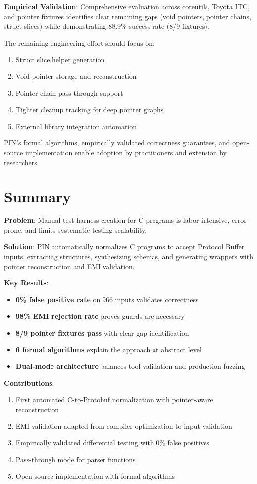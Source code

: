 \documentclass[doublespace,nopageskip]{VTthesis}
\begin{document}
\textbf{Empirical Validation}: Comprehensive evaluation across coreutils, Toyota ITC, and pointer fixtures identifies clear remaining gaps (void pointers, pointer chains, struct slices) while demonstrating 88.9\% success rate (8/9 fixtures).

The remaining engineering effort should focus on:
\begin{enumerate}
    \item Struct slice helper generation
    \item Void pointer storage and reconstruction
    \item Pointer chain pass-through support
    \item Tighter cleanup tracking for deep pointer graphs
    \item External library integration automation
\end{enumerate}

PIN's formal algorithms, empirically validated correctness guarantees, and open-source implementation enable adoption by practitioners and extension by researchers.

\chapter{Summary} \label{ch:summary}

\textbf{Problem}: Manual test harness creation for C programs is labor-intensive, error-prone, and limits systematic testing scalability.

\textbf{Solution}: PIN automatically normalizes C programs to accept Protocol Buffer inputs, extracting structures, synthesizing schemas, and generating wrappers with pointer reconstruction and EMI validation.

\textbf{Key Results}:
\begin{itemize}
    \item \textbf{0\% false positive rate} on 966 inputs validates correctness
    \item \textbf{98\% EMI rejection rate} proves guards are necessary
    \item \textbf{8/9 pointer fixtures pass} with clear gap identification
    \item \textbf{6 formal algorithms} explain the approach at abstract level
    \item \textbf{Dual-mode architecture} balances tool validation and production fuzzing
\end{itemize}

\textbf{Contributions}:
\begin{enumerate}
    \item First automated C-to-Protobuf normalization with pointer-aware reconstruction
    \item EMI validation adapted from compiler optimization to input validation
    \item Empirically validated differential testing with 0\% false positives
    \item Pass-through mode for parser functions
    \item Open-source implementation with formal algorithms
\end{enumerate}
\end{document}
